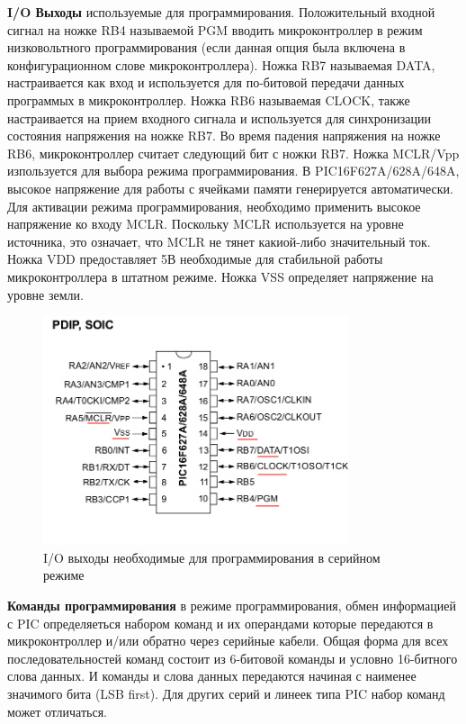 \textbf{I/O Выходы} используемые для программирования. Положительный входной сигнал на ножке RB4 называемой PGM вводить микроконтроллер в режим низковольтного программирования (если данная опция была включена в конфигурационном слове микроконтроллера). Ножка RB7 называемая DATA, настраивается как вход и используется для по-битовой передачи данных программых в микроконтроллер. Ножка RB6 называемая CLOCK, также настраивается на прием входного сигнала и используется для синхронизации состояния напряжения на ножке RB7. Во время падения напряжения на ножке RB6, микроконтроллер считает следующий бит с ножки RB7. Ножка MCLR/Vpp изпользуется для выбора режима программирования. В PIC16F627A/628A/648A, высокое напряжение для работы с ячейками памяти генерируется автоматически. Для активации
режима программирования, необходимо применить высокое напряжение ко входу MCLR. Поскольку MCLR используется на уровне источника, это означает, что MCLR не тянет какиой-либо значительный ток. Ножка VDD предоставляет 5В необходимые для стабильной работы микроконтроллера в штатном режиме. Ножка VSS определяет напряжение на уровне земли.

\begin{figure}[h!]
    \centering
    \includegraphics[width=0.8\textwidth]{2017-05-07_at_22:31:52_screenshot.png}
    \caption{I/O выходы необходимые для программирования в серийном режиме}
\end{figure}

\textbf{Команды программирования} 
в режиме программирования, обмен информацией с PIC определяеться набором команд и 
их операндами которые передаются в микроконтроллер и/или обратно через серийные кабели. 
Общая форма для всех последовательностей команд
состоит из 6-битовой команды и условно 16-битного
слова данных. И команды и слова данных передаются начиная с наименее значимого бита (LSB first).
Для других серий и линеек типа PIC набор команд может отличаться.

